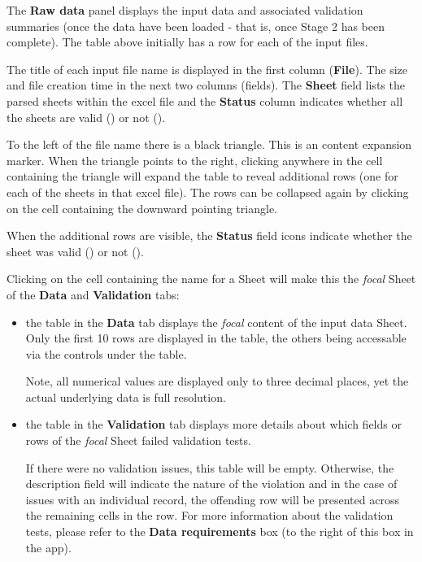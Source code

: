 \documentclass[
  8pt,
  a4paper]{article}
\begin{document}
The \textbf{Raw data} panel displays the input data and associated
validation summaries (once the data have been loaded - that is, once
Stage 2 has been complete). The table above initially has a row for each
of the input files.

The title of each input file name is displayed in the first column
(\textbf{File}). The size and file creation time in the next two columns
(fields). The \textbf{Sheet} field lists the parsed sheets within the
excel file and the \textbf{Status} column indicates whether all the
sheets are valid ({}) or not ({}).

To the left of the file name there is a black triangle. This is an
content expansion marker. When the triangle points to the right,
clicking anywhere in the cell containing the triangle will expand the
table to reveal additional rows (one for each of the sheets in that
excel file). The rows can be collapsed again by clicking on the cell
containing the downward pointing triangle.

When the additional rows are visible, the \textbf{Status} field icons
indicate whether the sheet was valid ({}) or not ({}).

Clicking on the cell containing the name for a Sheet will make this the
\emph{focal} Sheet of the \textbf{Data} and \textbf{Validation} tabs:

\begin{itemize}
\item
  the table in the \textbf{Data} tab displays the \emph{focal} content
  of the input data Sheet. Only the first 10 rows are displayed in the
  table, the others being accessable via the controls under the table.

  Note, all numerical values are displayed only to three decimal places,
  yet the actual underlying data is full resolution.
\item
  the table in the \textbf{Validation} tab displays more details about
  which fields or rows of the \emph{focal} Sheet failed validation
  tests.

  If there were no validation issues, this table will be empty.
  Otherwise, the description field will indicate the nature of the
  violation and in the case of issues with an individual record, the
  offending row will be presented across the remaining cells in the row.
  For more information about the validation tests, please refer to the
  \textbf{Data requirements} box (to the right of this box in the app).
\end{itemize}
\end{document}
